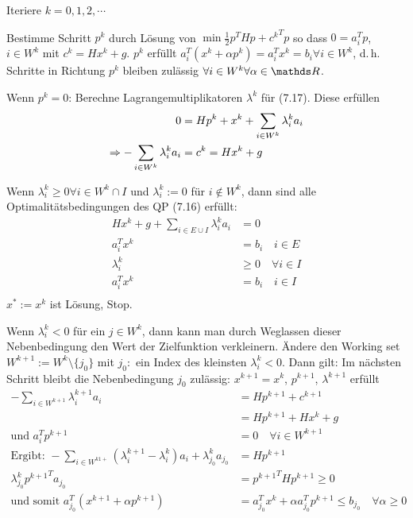 Iteriere $k=0,1,2,\cdots$
\item Bestimme Schritt $p^k$ durch Lösung von  $\min \frac 12 p^T H p + {c^k}^T p$ so dass $0 = a_i^T p$, $i \in W^k$ mit $c^k = H x^k + g$. $p^k$ erfüllt $a_i^T (x^k + \alpha p^k) = a_i^T x^k = b_i \forall i \in W^k$, d.\,h. Schritte in Richtung $p^k$ bleiben zulässig $\forall i \in W^k \forall \alpha \in \R$.
\item Wenn $p^k = 0$: Berechne Lagrangemultiplikatoren $\lambda^k$ für (7.17). Diese erfüllen
\begin{align*}
0 &= H p^k + x^k + \sum\limits_{i\in W^k} \lambda_i^k a_i \\
\Rightarrow - \sum\limits_{i\in W^k} \lambda_i^k a_i &= c^k = H x^k + g \\
\end{align*}
\item  Wenn $\lambda_i^k \geq 0 \forall i\in W^k \cap I$ und $\lambda_i^k := 0$ für $i \notin W^k$, dann sind alle Optimalitätsbedingungen des QP (7.16) erfüllt:
\begin{align*}
H x^k + g + \sum\limits_{i \in E \cup I} \lambda_i^k a_i &= 0 \\
a_i^Tx^k &= b_i \quad i \in E \\
\lambda_i^k & \geq 0 \quad \forall i \in I \\
a_i^T x^k &= b_i \quad i \in I \\
\end{align*}
$x^* := x^k$ ist Lösung, Stop.
\item Wenn $\lambda_i^k < 0$ für ein $j \in W^k$, dann kann man durch Weglassen dieser Nebenbedingung den Wert der Zielfunktion verkleinern. Ändere den Working set $W^{k+1} := W^k \setminus \{j_0 \}$ mit $j_0\colon$ ein Index des kleinsten $\lambda_i^k < 0$. Dann gilt: Im nächsten Schritt bleibt die Nebenbedingung $j_0$ zulässig: $x^{k+1} = x^k$, $p^{k+1}$, $\lambda^{k+1}$ erfüllt
\begin{align*}
-\sum\limits_{i\in W^{k+1}} \lambda_i^{k+1} a_i &= H p^{k+1} + c^{k+1} \\
&= H p^{k+1} + H x^k + g \\
\text{und } a_i^T p^{k+1} &= 0 \quad \forall i \in W^{k+1} \\
\text{Ergibt: } -\sum\limits_{i\in W^{k1+}} (\lambda_i^{k+1} - \lambda_i^k) a_i + \lambda_{j_0}^k a_{j_0} &= H p^{k+1} \\
\lambda_{j_0}^k {p^{k+1}}^T a_{j_0} &= {p^{k+1}}^T H p^{k+1} \geq 0 \\
\text{und somit } a_{j_0}^T (x^{k+1} + \alpha p^{k+1}) &= a_{j_0}^T x^k + \alpha a_{j_0}^T p^{k+1} \leq b_{j_0} \quad \forall \alpha \geq 0 \\
\end{align*}
